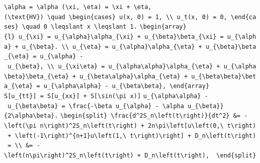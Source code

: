 \documentclass[
  ukrainian,
]{article}
\begin{document}
\texttt{\textbackslash{}alpha\ =\ \textbackslash{}alpha\ (\textbackslash{}xi,\ \textbackslash{}eta)\ =\ \textbackslash{}xi\ +\ \textbackslash{}eta,}
\texttt{(\textbackslash{}text\{HV\})\ \textbackslash{}quad\ \textbackslash{}begin\{cases\}\ u(x,\ 0)\ =\ 1,\ \textbackslash{}\textbackslash{}\ u\_t(x,\ 0)\ =\ 0,\ \textbackslash{}end\{cases\}\ \textbackslash{}quad\ 0\ \textbackslash{}leqslant\ x\ \textbackslash{}leqslant\ 1.}
\texttt{\textbackslash{}begin\{array\}\{l\}\ u\_\{\textbackslash{}xi\}\ =\ u\_\{\textbackslash{}alpha\}\textbackslash{}alpha\_\{\textbackslash{}xi\}\ +\ u\_\{\textbackslash{}beta\}\textbackslash{}beta\_\{\textbackslash{}xi\}\ =\ u\_\{\textbackslash{}alpha\}\ +\ u\_\{\textbackslash{}beta\}.\ \textbackslash{}\textbackslash{}\ u\_\{\textbackslash{}eta\}\ =\ u\_\{\textbackslash{}alpha\}\textbackslash{}alpha\_\{\textbackslash{}eta\}\ +\ u\_\{\textbackslash{}beta\}\textbackslash{}beta\_\{\textbackslash{}eta\}\ =\ u\_\{\textbackslash{}alpha\}\ -\ u\_\{\textbackslash{}beta\},\ \textbackslash{}\textbackslash{}\ u\_\{\textbackslash{}xi\textbackslash{}eta\}\ =\ u\_\{\textbackslash{}alpha\textbackslash{}alpha\}\textbackslash{}alpha\_\{\textbackslash{}eta\}\ +\ u\_\{\textbackslash{}alpha\textbackslash{}beta\}\textbackslash{}beta\_\{\textbackslash{}eta\}\ +\ u\_\{\textbackslash{}beta\textbackslash{}alpha\}\textbackslash{}alpha\_\{\textbackslash{}eta\}\ +\ u\_\{\textbackslash{}beta\textbackslash{}beta\}\textbackslash{}beta\_\{\textbackslash{}eta\}\ =\ u\_\{\textbackslash{}alpha\textbackslash{}alpha\}\ -\ u\_\{\textbackslash{}beta\textbackslash{}beta\},\ \textbackslash{}end\{array\}}
\texttt{S{[}u\_\{tt\}{]}\ =\ S{[}u\_\{xx\}{]}\ +\ S{[}\textbackslash{}sin(\textbackslash{}pi\ x){]}}
\texttt{u\_\{\textbackslash{}alpha\textbackslash{}alpha\}\ -\ u\_\{\textbackslash{}beta\textbackslash{}beta\}\ =\ \textbackslash{}frac\{-\textbackslash{}beta\ u\_\{\textbackslash{}alpha\}\ -\ \textbackslash{}alpha\ u\_\{\textbackslash{}beta\}\}\{2\textbackslash{}alpha\textbackslash{}beta\}.}
\texttt{\textbackslash{}begin\{split\}\ \textbackslash{}frac\{d\^{}2S\_n\textbackslash{}left(t\textbackslash{}right)\}\{dt\^{}2\}\ \&=\ -\textbackslash{}left(\textbackslash{}pi\ n\textbackslash{}right)\^{}2S\_n\textbackslash{}left(t\textbackslash{}right)\ +\ 2n\textbackslash{}pi\textbackslash{}left{[}u\textbackslash{}left(0,\textbackslash{}\ t\textbackslash{}right)\ +\ \textbackslash{}left(-1\textbackslash{}right)\^{}\{n+1\}u\textbackslash{}left(1,\textbackslash{}\ t\textbackslash{}right)\textbackslash{}right{]}\ +\ D\_n\textbackslash{}left(t\textbackslash{}right)\ =\ \textbackslash{}\textbackslash{}\ \&=\ -\textbackslash{}left(n\textbackslash{}pi\textbackslash{}right)\^{}2S\_n\textbackslash{}left(t\textbackslash{}right)\ +\ D\_n\textbackslash{}left(t\textbackslash{}right),\ \ \textbackslash{}end\{split\}}
\end{document}
